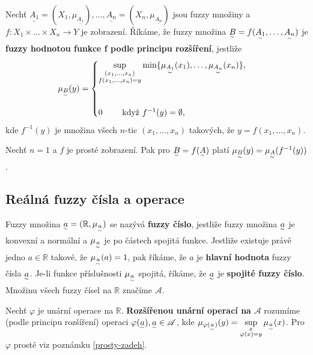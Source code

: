 {\begin{definition}
Nechť $\underset{^\sim}{A_1} = (X_1, \mu_{\underset{^\sim}{A_1}}), \ldots, \underset{^\sim}{A_n} = (X_n, \mu_{\underset{^\sim}{A_n}})$ jsou fuzzy množiny a $f: X_1 \times \ldots \times X_n \rightarrow Y$ je zobrazení. Říkáme, že fuzzy množina $\underset{^\sim}B = f(\underset{^\sim}{A_1}, \ldots, \underset{^\sim}{A_n})$ je \textbf{fuzzy hodnotou funkce f podle principu rozšíření}, jestliže
\begin{equation*}
\muB(y)=
 \begin{cases}
\sup\limits_{\substack{(x_1, \ldots, x_n) \\ f(x_1, \ldots, x_n)=y}} \min\lbrace \mu_{\underset{^\sim}{A_1}}(x_1), \ldots, \mu_{\underset{^\sim}{A_n}}(x_n) \rbrace, \\
\bigskip
\\
 0\qquad \text{ když }  f^{-1}(y) = \emptyset, 
  \end{cases}
\end{equation*}
kde $f^{-1}(y)$ je množina všech $n$-tic $(x_1, \ldots, x_n)$ takových, že $y = f(x_1, \ldots, x_n)$.
\end{definition}

\begin{remark}\label{prosty-zadeh}
Nechť $n=1$ a $f$ je prosté zobrazení. Pak pro $\underset{^\sim}B = f(\underset{^\sim}A)$ platí $\mu_{\underset{^\sim}B}(y)=\mu_{\underset{^\sim}A}(f^{-1}(y))$.
\end{remark}



\subsection{Reálná fuzzy čísla a operace}

\begin{definition}
Fuzzy množina $\underset{^\sim}a = (\mathbb{R}, \mu_{\underset{^\sim}a})$ se nazývá \textbf{fuzzy číslo}, jestliže fuzzy množina $\underset{^\sim}a$ je konvexní a normální a $\mu_{\underset{^\sim}a}$ je po částech spojitá funkce. Jestliže existuje právě jedno $a \in \mathbb{R}$ takové, že $\mu_{\underset{^\sim}a}(a)=1$, pak říkáme, že $a$ je \textbf{hlavní hodnota} fuzzy čísla $\underset{^\sim}a$. Je-li funkce příslušnosti $\mu_{\underset{^\sim}a}$ spojitá, říkáme, že $\underset{^\sim}a$ je \textbf{spojité fuzzy číslo}. Množinu všech fuzzy čísel na $\mathbb{R}$ značíme $\mathcal{A}$. 
\end{definition}

\begin{definition}
Nechť $\varphi$ je unární operace na $\mathbb{R}$. \textbf{Rozšířenou unární operací na} $\mathcal{A}$ rozumíme (podle principu rozšíření) operaci $\varphi(\underset{^\sim}a), \underset{^\sim}a \in \mathcal{A}$, kde $\mu_{\varphi(\underset{^\sim}a)}(y) = \sup\limits_{\substack{x \\ \varphi(x)=y}} \mu_{\underset{^\sim}a}(x)$. Pro $\varphi$ prosté viz poznámku \ref{prosty-zadeh}.
\end{definition}

}
